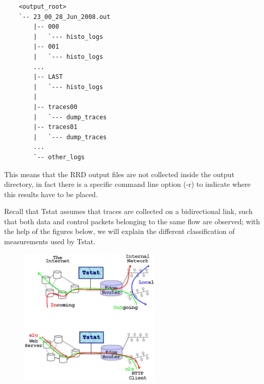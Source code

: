 \documentclass[11pt]{article}
\begin{document}
\begin{small}\begin{verbatim}
    <output_root>
    `-- 23_00_28_Jun_2008.out
        |-- 000
        |   `--- histo_logs
        |-- 001
        |   `--- histo_logs
        ...
        |-- LAST
        |   `--- histo_logs
        |
        |-- traces00
        |   `--- dump_traces
        |-- traces01
        |   `--- dump_traces
        ...
        `-- other_logs
\end{verbatim}\end{small} \noindent
This means that the RRD output files are not collected inside the output directory, 
in fact there is a specific command line option (-r) to indicate where this results 
have to be placed.



Recall that Tstat assumes that traces are collected on a bidirectional link,
such that both data and control packets belonging to the same flow are observed;
with the help of the figures below, we will explain the different classification
of measurements used by Tstat.



         \begin{figure}[!htb]
             \begin{center}
                 \includegraphics[width=0.6\textwidth]{tstat_output.eps}
             \end{center}
         \end{figure}
\end{document}
